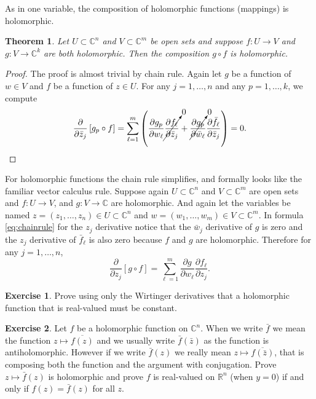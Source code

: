 \documentclass[12pt,openany]{book}
\newcommand{\C}{{\mathbb{C}}}
\newcommand{\R}{{\mathbb{R}}}
\theoremstyle{plain}
\newtheorem{thm}{Theorem}[section]
\theoremstyle{remark}
\theoremstyle{definition}
\newenvironment{exbox}{%
    \def\FrameCommand{\vrule width 1pt \relax\hspace {10pt}}%
    \MakeFramed {\advance \hsize -\width \FrameRestore }%
}{%
    \endMakeFramed
}
\theoremstyle{exercise}
\newtheorem{exercise}{Exercise}[section]
\theoremstyle{example}
\begin{document}
As in one variable, the composition of holomorphic functions (mappings) is
holomorphic.

\begin{thm}
Let $U \subset \C^n$ and $V \subset \C^m$ be open sets and suppose
$f \colon U \to V$ and $g \colon V \to \C^k$ are both holomorphic.
Then the composition $g \circ f$ is holomorphic.
\end{thm}

\begin{proof}
The proof is almost trivial by chain rule.
Again let $g$ be a function of $w \in V$ and $f$ be a function of $z \in U$.
For any $j = 1,\ldots,n$ and any $p=1,\ldots,k$, we compute
\begin{equation*}
\frac{\partial}{\partial \bar{z}_j} \left[ g_p \circ f \right]
=
\sum_{\ell=1}^m 
\left(
\frac{\partial g_p}{\partial w_\ell} 
\cancelto{0}{\frac{\partial f_\ell}{\partial \bar{z}_j}}
+
\cancelto{0}{\frac{\partial g_p}{\partial \bar{w}_\ell}}
\frac{\partial \bar{f}_\ell}{\partial \bar{z}_j} 
\right)
=
0 . \qedhere
\end{equation*}
\end{proof}

For holomorphic functions the chain rule simplifies, and formally looks
like the familiar vector calculus rule.
Suppose again
$U \subset \C^n$ and $V \subset \C^m$ are open sets and 
$f \colon U \to V$, and $g \colon V \to \C$ are holomorphic.
And again let the variables be named
$z = (z_1,\ldots,z_n) \in U \subset \C^n$ and $w = (w_1,\ldots,w_m) \in V
\subset \C^m$.  In formula \eqref{eq:chainrule} for the $z_j$ derivative
notice that 
the $\bar{w}_j$ derivative of $g$ is zero and the $z_j$ derivative of
$\bar{f}_\ell$ is also zero because $f$ and $g$ are holomorphic.
Therefore for any $j=1,\ldots,n$,
\begin{equation*}
\frac{\partial}{\partial z_j} \left[ g \circ f \right]
=
\sum_{\ell=1}^m 
\frac{\partial g}{\partial w_\ell}
\frac{\partial f_\ell}{\partial z_j} .
\end{equation*}

\begin{exbox}
\begin{exercise}
Prove using only the Wirtinger derivatives that a holomorphic function
that is real-valued must be constant.
\end{exercise}

\begin{exercise}
Let $f$ be a holomorphic function on $\C^n$.
When we write $\bar{f}$ we mean the function $z \mapsto \overline{f(z)}$
and we usually write $\bar{f}(\bar{z})$ as the function is antiholomorphic.
However if we write $\bar{f}(z)$ we really mean $z \mapsto \overline{f(\bar{z})}$,
that is composing both the function and the argument with conjugation.
Prove $z \mapsto \bar{f}(z)$ is holomorphic and prove $f$ is
real-valued on $\R^n$ (when $y=0$) if and only if $f(z) =
\bar{f}(z)$ for all $z$.
\end{exercise}
\end{exbox}
\end{document}
